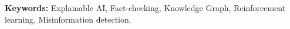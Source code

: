 \documentclass[conference]{IEEEtran}
\begin{document}
\begin{abstract}

\end{abstract}


\textbf{Keywords: }Explainable AI, Fact-checking, Knowledge Graph, Reinforcement learning, 
Misinformation detection.
\end{document}

